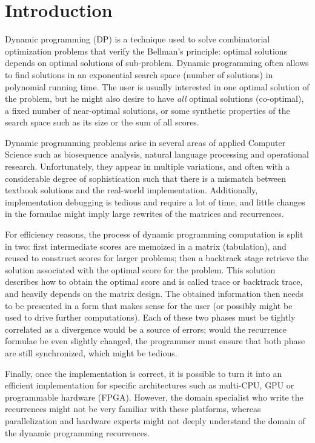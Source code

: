 \newpage
\setcounter{tocdepth}{2} \tableofcontents
\newpage
\section{Introduction}
Dynamic programming (DP) is a technique used to solve combinatorial optimization problems that verify the Bellman's principle: optimal solutions depends on optimal solutions of sub-problem. Dynamic programming often allows to find solutions in an exponential search space (number of solutions) in polynomial running time. The user is usually interested in one optimal solution of the problem, but he might also desire to have \textit{all} optimal solutions (co-optimal), a fixed number of near-optimal solutions, or some synthetic properties of the search space such as its size or the sum of all scores.

Dynamic programming problems arise in several areas of applied Computer Science such as biosequence analysis, natural language processing and operational research. Unfortunately, they appear in multiple variations, and often with a considerable degree of sophistication such that there is a mismatch between textbook solutions and the real-world implementation. Additionally, implementation debugging is tedious and require a lot of time, and little changes in the formulae might imply large rewrites of the matrices and recurrences. \cite{gapc_yield}

For efficiency reasons, the process of dynamic programming computation is split in two: first intermediate scores are memoized in a matrix (tabulation), and reused to construct scores for larger problems; then a backtrack stage retrieve the solution associated with the optimal score for the problem. This solution describes how to obtain the optimal score and is called trace or backtrack trace, and heavily depends on the matrix design. The obtained information then needs to be presented in a form that makes sense for the user (or possibly might be used to drive further computations). Each of these two phases must be tightly correlated as a divergence would be a source of errors; would the recurrence formulae be even slightly changed, the programmer must ensure that both phase are still synchronized, which might be tedious.

Finally, once the implementation is correct, it is possible to turn it into an efficient implementation for specific architectures such as multi-CPU, GPU or programmable hardware (FPGA). However, the domain specialist who write the recurrences might not be very familiar with these platforms, whereas parallelization and hardware experts might not deeply understand the domain of the dynamic programming recurrences.

